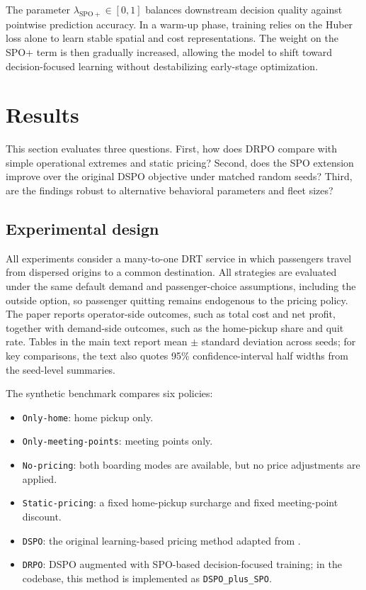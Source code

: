 \documentclass[preprint,12pt,authoryear]{elsarticle}
\begin{document}
The parameter $\lambda_{\mathrm{SPO}+}\in[0,1]$ balances downstream decision quality against pointwise prediction accuracy. In a warm-up phase, training relies on the Huber loss alone to learn stable spatial and cost representations. The weight on the SPO+ term is then gradually increased, allowing the model to shift toward decision-focused learning without destabilizing early-stage optimization.

\section{Results}
\label{sec:results}

This section evaluates three questions. First, how does DRPO compare with simple operational extremes and static pricing? Second, does the SPO extension improve over the original DSPO objective under matched random seeds? Third, are the findings robust to alternative behavioral parameters and fleet sizes?

\subsection{Experimental design}

All experiments consider a many-to-one DRT service in which passengers travel from dispersed origins to a common destination. All strategies are evaluated under the same default demand and passenger-choice assumptions, including the outside option, so passenger quitting remains endogenous to the pricing policy. The paper reports operator-side outcomes, such as total cost and net profit, together with demand-side outcomes, such as the home-pickup share and quit rate. Tables in the main text report mean $\pm$ standard deviation across seeds; for key comparisons, the text also quotes 95\% confidence-interval half widths from the seed-level summaries.

The synthetic benchmark compares six policies:
\begin{itemize}
\item \texttt{Only-home}: home pickup only.
\item \texttt{Only-meeting-points}: meeting points only.
\item \texttt{No-pricing}: both boarding modes are available, but no price adjustments are applied.
\item \texttt{Static-pricing}: a fixed home-pickup surcharge and fixed meeting-point discount.
\item \texttt{DSPO}: the original learning-based pricing method adapted from \citet{akkerman2025}.
\item \texttt{DRPO}: DSPO augmented with SPO-based decision-focused training; in the codebase, this method is implemented as \texttt{DSPO\_plus\_SPO}.
\end{itemize}
\end{document}
